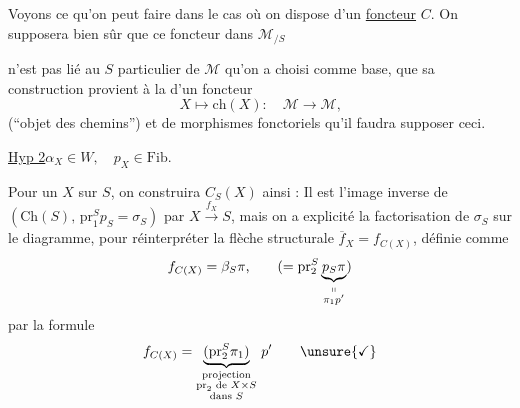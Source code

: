 Voyons ce qu'on peut faire dans le cas où on dispose d'un \uline{foncteur} $C$. On supposera bien sûr que ce foncteur dans $\mathcal M_{/S}$

n'est pas lié au $S$ particulier de $\mathcal M$ qu'on a choisi comme base, que sa construction provient à la  d'un foncteur
\[
X\longmapsto\mathrm{ch}(X):\quad\mathcal M\longrightarrow\mathcal M\text{,}
\]
(``objet des chemins'') et de morphismes fonctoriels
 qu'il faudra supposer  ceci.

\uline{Hyp 2}\quad $\alpha_X\in W,\quad p_X\in\mathrm{Fib}$.

Pour un $X$ sur $S$, on construira \unsure{((} $C_S(X)$  ainsi :
Il est l'image inverse de $(\mathrm{Ch}(S),\,\mathrm{pr}_1^S p_S=\sigma_S)$ par $X\xrightarrow{f_X}S$, mais on a explicité la factorisation de $\sigma_S$ sur le diagramme, pour réinterpréter la flèche structurale $\overline f_X=f_{C(X)}$, définie comme
\[
f_{C(X)}=\beta_S\pi\text{,}\qquad(=\mathrm{pr}_2^S\underbrace{p_S\pi}_{\substack{\shortparallel\\\pi_1p'}})
\]
par la formule
\[
f_{C(X)}=\underbrace{(\mathrm{pr}_2^S\pi_1)}_{\substack{\text{projection}\\\mathrm{pr}_2\text{ de }X\times S\\\text{dans }S}}\,p'\qquad\unsure{\checkmark}
\]

